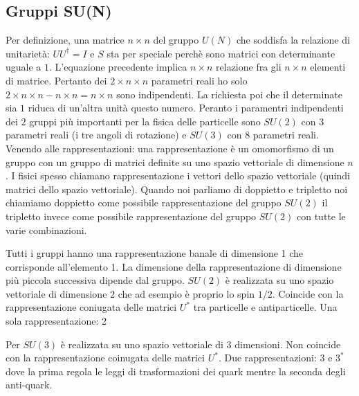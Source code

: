 \subsection{Gruppi SU(N)}
Per definizione, una matrice $n\times n$ del gruppo $U(N)$ che soddisfa la relazione di unitarietà: $UU^\dagger=I$ e $S$ sta per speciale perchè sono matrici con determinante uguale a $1$. L'equazione precedente implica $n\times n$ relazione fra gli $n\times n$ elementi di matrice. Pertanto dei $2\times n \times n$ parametri reali ho solo $2\times n \times n-n\times n=n\times n$ sono indipendenti. La richiesta poi che il determinate sia $1$ riduca di un'altra unità questo numero. Peranto i paramentri indipendenti dei $2$ gruppi più importanti per la fisica delle particelle sono $SU(2)$ con 3 parametri reali (i tre angoli di rotazione) e $SU(3)$ con 8 parametri reali. Venendo alle rappresentazioni: una rappresentazione è un omomorfismo di un gruppo con un gruppo di matrici definite su uno spazio vettoriale di dimensione $n$. I fisici spesso chiamano rappresentazione i vettori dello spazio vettoriale (quindi matrici dello spazio vettoriale). Quando noi parliamo di doppietto e tripletto noi chiamiamo doppietto come possibile rappresentazione del gruppo $SU(2)$ il tripletto invece come possibile rappresentazione del gruppo $SU(2)$ con tutte le varie combinazioni. 

Tutti i gruppi hanno una rappresentazione banale di dimensione 1 che corrisponde all'elemento 1. La dimensione della rappresentazione di dimensione più piccola successiva dipende dal gruppo. $SU(2)$ è realizzata su uno spazio vettoriale di dimensione $2$ che ad esempio è proprio lo spin $1/2$. Coincide con la rappresentazione coniugata delle matrici $U^*$ tra particelle e antiparticelle. Una sola rappresentazione: 2

Per $SU(3)$ è realizzata su uno spazio vettoriale di 3 dimensioni. Non coincide con la rappresentazione coinugata delle matrici $U^*$. Due rappresentazioni: $3$ e $3^*$ dove la prima regola le leggi di trasformazioni dei quark mentre la seconda degli anti-quark.
